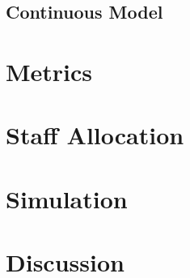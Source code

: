 \documentclass{article}
\begin{document}
		
		\subsection{Continuous Model}
	
	
	\section{Metrics}
	
	
	\section{Staff Allocation}
	
	
	\section{Simulation}
	
	
	\section{Discussion}
	
	
\end{document}

